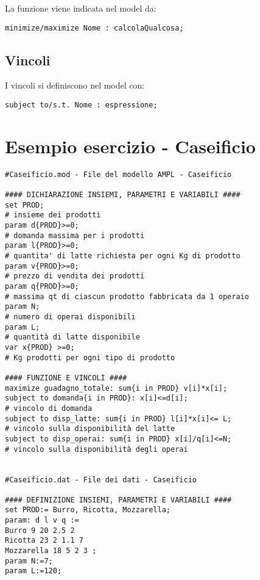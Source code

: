 La funzione viene indicata nel model da:
\begin{verbatim}
minimize/maximize Nome : calcolaQualcosa;
\end{verbatim}


\subsection{Vincoli}
I vincoli si definiscono nel model con:
\begin{verbatim}
subject to/s.t. Nome : espressione;
\end{verbatim}

\section{Esempio esercizio - Caseificio}
\begin{framed}
\begin{verbatim}
#Caseificio.mod - File del modello AMPL - Caseificio

#### DICHIARAZIONE INSIEMI, PARAMETRI E VARIABILI ####
set PROD;
# insieme dei prodotti
param d{PROD}>=0;
# domanda massima per i prodotti
param l{PROD}>=0;
# quantita' di latte richiesta per ogni Kg di prodotto
param v{PROD}>=0;
# prezzo di vendita dei prodotti
param q{PROD}>=0;
# massima qt di ciascun prodotto fabbricata da 1 operaio
param N;
# numero di operai disponibili
param L;
# quantità di latte disponibile
var x{PROD} >=0;
# Kg prodotti per ogni tipo di prodotto

#### FUNZIONE E VINCOLI ####
maximize guadagno_totale: sum{i in PROD} v[i]*x[i];
subject to domanda{i in PROD}: x[i]<=d[i];
# vincolo di domanda
subject to disp_latte: sum{i in PROD} l[i]*x[i]<= L;
# vincolo sulla disponibilità del latte
subject to disp_operai: sum{i in PROD} x[i]/q[i]<=N;
# vincolo sulla disponibilità degli operai


#Caseificio.dat - File dei dati - Caseificio

#### DEFINIZIONE INSIEMI, PARAMETRI E VARIABILI ####
set PROD:= Burro, Ricotta, Mozzarella;
param: d l v q :=
Burro 9 20 2.5 2
Ricotta 23 2 1.1 7
Mozzarella 18 5 2 3 ;
param N:=7;
param L:=120;
\end{verbatim}
\end{framed}





